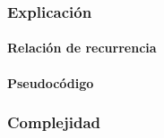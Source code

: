 \subsubsection{Explicación}

\paragraph{Relación de recurrencia}

\paragraph{Pseudocódigo}

\subsubsection{Complejidad}